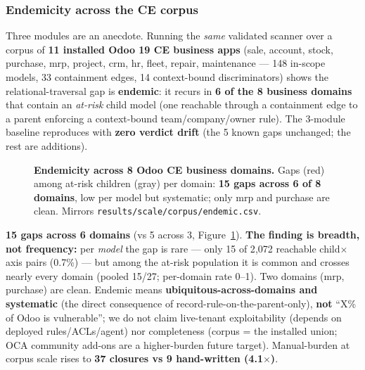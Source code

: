\documentclass[11pt,a4paper]{article}
\newcommand{\code}[1]{\texttt{#1}}
\begin{document}
\subsubsection{Endemicity across the CE corpus}
Three modules are an anecdote. Running the \emph{same} validated scanner over a corpus of \textbf{11 installed
Odoo 19 CE business apps} (sale, account, stock, purchase, mrp, project, crm, hr, fleet, repair, maintenance ---
148 in-scope models, 33 containment edges, 14 context-bound discriminators) shows the relational-traversal gap
is \textbf{endemic}: it recurs in \textbf{6 of the 8 business domains} that contain an \emph{at-risk} child
model (one reachable through a containment edge to a parent enforcing a context-bound team/company/owner rule).
The 3-module baseline reproduces with \textbf{zero verdict drift} (the 5 known gaps unchanged; the rest are
additions).

\begin{figure}[t]
\centering
\caption{\textbf{Endemicity across 8 Odoo CE business domains.} Gaps (red) among at-risk children (gray) per
domain: \textbf{15 gaps across 6 of 8 domains}, low per model but systematic; only mrp and purchase are clean.
Mirrors \code{results/scale/corpus/endemic.csv}.}
\label{fig:endemic}
\end{figure}

\textbf{15 gaps across 6 domains} (vs 5 across 3, Figure~\ref{fig:endemic}). \textbf{The finding is breadth, not frequency:} per
\emph{model} the gap is rare --- only 15 of 2{,}072 reachable child$\times$axis pairs (0.7\%) --- but among the
at-risk population it is common and crosses nearly every domain (pooled 15/27; per-domain rate 0--1). Two
domains (mrp, purchase) are clean. Endemic means \textbf{ubiquitous-across-domains and systematic} (the direct
consequence of record-rule-on-the-parent-only), \textbf{not} ``X\% of Odoo is vulnerable''; we do not claim
live-tenant exploitability (depends on deployed rules/ACLs/agent) nor completeness (corpus = the installed
union; OCA community add-ons are a higher-burden future target). Manual-burden at corpus scale rises to
\textbf{37 closures vs 9 hand-written (4.1$\times$)}.
\end{document}
